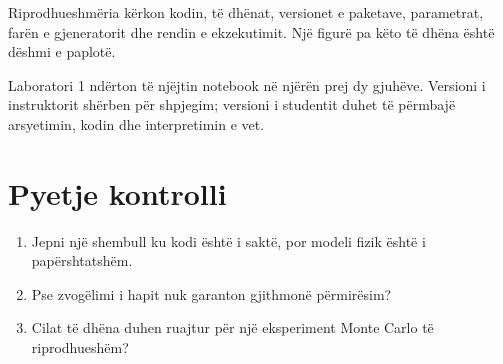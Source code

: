 Riprodhueshmëria kërkon kodin, të dhënat, versionet e paketave, parametrat, farën e gjeneratorit dhe rendin e ekzekutimit. Një figurë pa këto të dhëna është dëshmi e paplotë.

\begin{lidhje}
Laboratori 1 ndërton të njëjtin notebook në njërën prej dy gjuhëve. Versioni i instruktorit shërben për shpjegim; versioni i studentit duhet të përmbajë arsyetimin, kodin dhe interpretimin e vet.
\end{lidhje}

\section*{Pyetje kontrolli}
\begin{enumerate}
\item Jepni një shembull ku kodi është i saktë, por modeli fizik është i papërshtatshëm.
\item Pse zvogëlimi i hapit nuk garanton gjithmonë përmirësim?
\item Cilat të dhëna duhen ruajtur për një eksperiment Monte Carlo të riprodhueshëm?
\end{enumerate}



